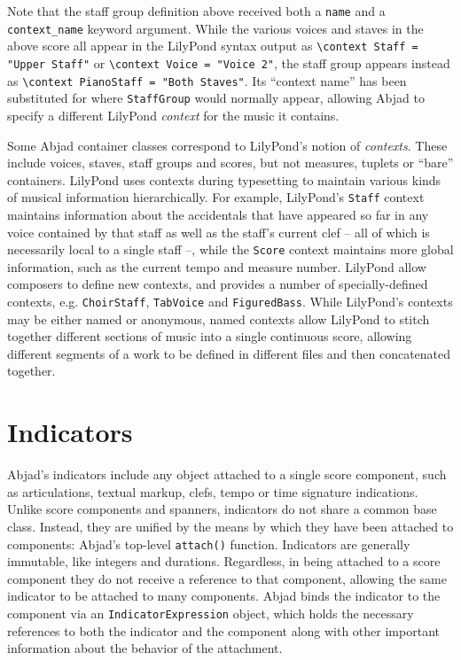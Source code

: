 \noindent Note that the staff group definition above received both a
\texttt{name} and a \texttt{context\_name} keyword argument. While the various
voices and staves in the above score all appear in the LilyPond syntax output
as \texttt{\textbackslash{}context Staff = "Upper Staff"} or
\texttt{\textbackslash{}context Voice = "Voice 2"}, the staff group appears
instead as \texttt{\textbackslash{}context PianoStaff = "Both Staves"}. Its
\enquote{context name} has been substituted for where \texttt{StaffGroup} would
normally appear, allowing Abjad to specify a different LilyPond \emph{context}
for the music it contains.

Some Abjad container classes correspond to LilyPond's notion of
\emph{contexts}. These include voices, staves, staff groups and scores, but not
measures, tuplets or \enquote{bare} containers. LilyPond uses contexts during
typesetting to maintain various kinds of musical information hierarchically.
For example, LilyPond's \texttt{Staff} context maintains information about the
accidentals that have appeared so far in any voice contained by that staff as
well as the staff's current clef -- all of which is necessarily local to a
single staff --, while the \texttt{Score} context maintains more global
information, such as the current tempo and measure number. LilyPond allow
composers to define new contexts, and provides a number of specially-defined
contexts, e.g. \texttt{ChoirStaff}, \texttt{TabVoice} and \texttt{FiguredBass}.
While LilyPond's contexts may be either named or anonymous, named contexts
allow LilyPond to stitch together different sections of music into a single
continuous score, allowing different segments of a work to be defined in
different files and then concatenated together.

\section{Indicators}
\label{sec:indicators}

Abjad's indicators include any object attached to a single score component,
such as articulations, textual markup, clefs, tempo or time signature
indications. Unlike score components and spanners, indicators do not share a
common base class. Instead, they are unified by the means by which they have
been attached to components: Abjad's top-level \texttt{attach()} function.
Indicators are generally immutable, like integers and durations. Regardless, in
being attached to a score component they do not receive a reference to that
component, allowing the same indicator to be attached to many components. Abjad
binds the indicator to the component via an \texttt{IndicatorExpression}
object, which holds the necessary references to both the indicator and the
component along with other important information about the behavior of the
attachment.

